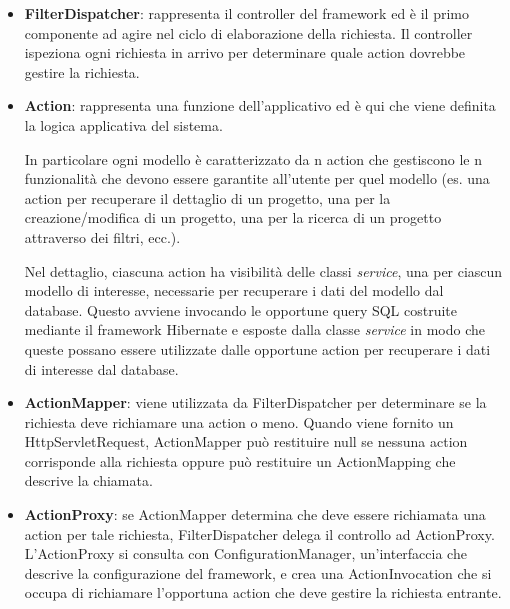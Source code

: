 \begin{itemize}
\item \textbf{FilterDispatcher}: rappresenta il controller del framework ed è il primo componente ad agire nel ciclo di elaborazione della richiesta. Il controller ispeziona ogni richiesta in arrivo per determinare quale action dovrebbe gestire la richiesta.
\setlength{\parskip}{3ex}

\item \textbf{Action}: rappresenta una funzione dell'applicativo ed è qui che viene definita la logica applicativa del sistema.

\setlength{\parskip}{2ex}

In particolare ogni modello è caratterizzato da n action che gestiscono le n funzionalità che devono essere garantite all'utente per quel modello (es. una action per recuperare il dettaglio di un progetto, una per la creazione/modifica di un progetto, una per la ricerca di un progetto attraverso dei filtri, ecc.).

\setlength{\parskip}{2ex}

Nel dettaglio, ciascuna action ha visibilità delle classi \textit{service}, una per ciascun modello di interesse, necessarie per recuperare i dati del modello dal database. Questo avviene invocando le opportune query SQL costruite mediante il framework Hibernate e esposte dalla classe \textit{service} in modo che queste possano essere utilizzate dalle opportune action per recuperare i dati di interesse dal database.

\setlength{\parskip}{3ex}

\item \textbf{ActionMapper}: viene utilizzata da FilterDispatcher per determinare se la richiesta deve richiamare una action o meno. Quando viene fornito un HttpServletRequest, ActionMapper può restituire null se nessuna action corrisponde alla richiesta  oppure può restituire un ActionMapping che descrive la chiamata.

\setlength{\parskip}{3ex}

\item \textbf{ActionProxy}: se ActionMapper determina che deve essere richiamata una action per tale richiesta, FilterDispatcher delega il controllo ad ActionProxy. L'ActionProxy si consulta con ConfigurationManager, un'interfaccia che descrive la configurazione del framework, e crea una ActionInvocation che si occupa di richiamare l'opportuna action che deve gestire la richiesta entrante.
\setlength{\parskip}{3ex}


\end{itemize}
